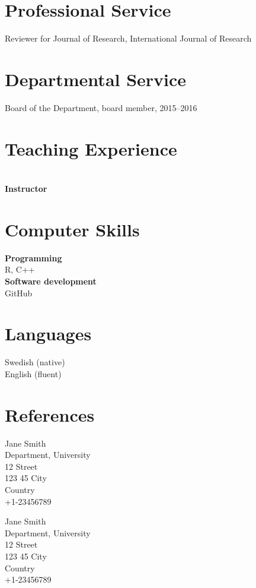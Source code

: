 \documentclass[12pt]{karencv}
\begin{document}
\section{Professional Service}
Reviewer for Journal of Research, International Journal of Research
\section{Departmental Service}
Board of the Department, board member, 2015--2016
\section{Teaching Experience}
~\\
\textbf{Instructor}\\

\section{Computer Skills}
\textbf{Programming}\\
R, C++\\
\textbf{Software development}\\
GitHub

\section{Languages}
Swedish (native)\\
English (fluent)

\section{References}
\begin{reflist}
\item Jane Smith \\
Department, University\\
12 Street \\
123 45 City\\
Country\\
+1-23456789\\
\item Jane Smith \\
Department, University\\
12 Street \\
123 45 City\\
Country\\
+1-23456789\\
\end{reflist}
\end{document}
